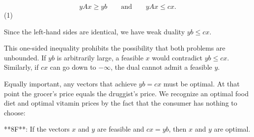 \[yAx\geq yb\qquad\text{and}\qquad yAx\leq cx.\] (1)

Since the left-hand sides are identical, we have weak duality \(yb\leq cx\). 

This one-sided inequality prohibits the possibility that both problems are unbounded. If \(yb\) is arbitrarily large, a feasible \(x\) would contradict \(yb\leq cx\). Similarly, if \(cx\) can go down to \(-\infty\), the dual cannot admit a feasible \(y\).

Equally important, any vectors that achieve \(yb=cx\) must be optimal. At that point the grocer's price equals the druggist's price. We recognize an optimal food diet and optimal vitamin prices by the fact that the consumer has nothing to choose:

**8F**: If the vectors \(x\) and \(y\) are feasible and \(cx=yb\), then \(x\) and \(y\) are optimal.

 